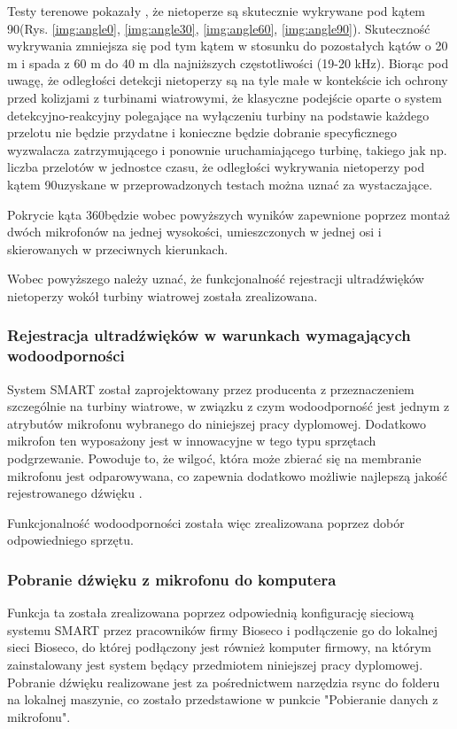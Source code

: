 \documentclass{sprz}
\begin{document}
Testy terenowe pokazały , że nietoperze są skutecznie wykrywane pod kątem 90\textdegree (Rys. \ref{img:angle0}, \ref{img:angle30}, \ref{img:angle60}, \ref{img:angle90}). Skuteczność wykrywania zmniejsza się pod tym kątem w stosunku do pozostałych kątów o 20 m i spada z 60 m do 40 m dla najniższych częstotliwości (19-20 kHz). Biorąc pod uwagę, że odległości detekcji nietoperzy są na tyle małe w kontekście ich ochrony przed kolizjami z turbinami wiatrowymi, że klasyczne podejście oparte o system detekcyjno-reakcyjny polegające
na wyłączeniu turbiny na podstawie każdego przelotu nie będzie przydatne i konieczne będzie dobranie specyficznego wyzwalacza zatrzymującego i ponownie uruchamiającego turbinę, takiego jak np. liczba przelotów w jednostce czasu, że odległości wykrywania nietoperzy pod kątem 90\textdegree uzyskane w przeprowadzonych testach można uznać za wystaczające. 

Pokrycie kąta 360\textdegree będzie wobec powyższych wyników zapewnione poprzez montaż dwóch mikrofonów na jednej wysokości, umieszczonych w jednej osi i skierowanych w przeciwnych kierunkach.

Wobec powyższego należy uznać, że funkcjonalność rejestracji ultradźwięków nietoperzy wokół turbiny wiatrowej została zrealizowana.


\subsubsection{Rejestracja ultradźwięków w warunkach wymagających wodoodporności}
System SMART został zaprojektowany przez producenta z przeznaczeniem szczególnie na turbiny wiatrowe, w związku z czym wodoodporność jest jednym z atrybutów mikrofonu wybranego do niniejszej pracy dyplomowej. Dodatkowo mikrofon ten wyposażony jest w innowacyjne w tego typu sprzętach podgrzewanie. Powoduje to, że wilgoć, która może zbierać się na membranie mikrofonu jest odparowywana, co zapewnia dodatkowo możliwie najlepszą jakość rejestrowanego dźwięku \cite{smart-user-guide}. 


Funkcjonalność wodoodporności została więc zrealizowana poprzez dobór odpowiedniego sprzętu.

\subsubsection{Pobranie dźwięku z mikrofonu do komputera}
Funkcja ta została zrealizowana poprzez odpowiednią konfigurację sieciową systemu SMART przez pracowników firmy Bioseco i podłączenie go do lokalnej sieci Bioseco, do której podłączony jest również komputer firmowy, na którym zainstalowany jest system będący przedmiotem niniejszej pracy dyplomowej. Pobranie dźwięku realizowane jest za pośrednictwem narzędzia rsync do folderu na lokalnej maszynie, co zostało przedstawione w punkcie "Pobieranie danych z mikrofonu". 
\end{document}

